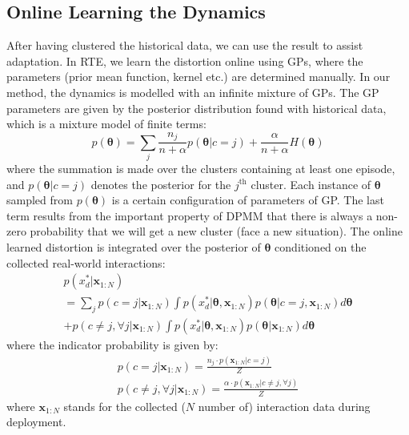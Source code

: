 \documentclass[journal]{IEEEtran}
\begin{document}
\subsection{Online Learning the Dynamics}
After having clustered the historical data, we can use the result to assist adaptation.
In RTE, we learn the distortion online using GPs, where the parameters (prior mean function, kernel etc.) are determined manually.
In our method, the dynamics is modelled with an infinite mixture of GPs. 
The GP parameters are given by the posterior distribution found with historical data, which is a mixture model of finite terms:
\begin{equation}
p(\bm{\theta}) = \sum_j \frac{n_j}{n + \alpha} p(\bm{\theta}|c=j) 
+ \frac{\alpha}{n + \alpha} H(\bm{\theta})
\label{trained_mixture_model}
\end{equation}
where the summation is made over the clusters containing at least one episode, and $p(\bm{\theta}|c=j)$ denotes the posterior for the $j^{\text{th}}$ cluster.
Each instance of $\bm{\theta}$ sampled from $p(\bm{\theta})$ is a certain configuration of parameters of GP.
The last term results from the important property of DPMM that there is always a non-zero probability that we will get a new cluster (face a new situation).
The online learned distortion is integrated over the posterior of $\bm{\theta}$ conditioned on the collected real-world interactions:
\begin{equation}
\begin{gathered}
p(x^*_d|\bm{x}_{1:N}) 
\\
= \sum_j p(c=j| \bm{x}_{1:N}) \int p(x^*_d|\bm{\theta}, \bm{x}_{1:N})p(\bm{\theta}|c=j, \bm{x}_{1:N}) d\bm{\theta} 
\\
+ p(c \neq j, \forall j|\bm{x}_{1:N}) \int p(x^*_d|\bm{\theta}, \bm{x}_{1:N}) p(\bm{\theta} | \bm{x}_{1:N}) d\bm{\theta}
\end{gathered}
\label{MGP_posterior}
\end{equation}
where the indicator probability is given by:
\begin{equation}
\begin{gathered}
p(c=j| \bm{x}_{1:N}) 
= \frac{n_j \cdot p(\bm{x}_{1:N}|c=j)
}{Z}
\\ 
p(c \neq j, \forall j| \bm{x}_{1:N})
= \frac{\alpha \cdot p(\bm{x}_{1:N}|c \neq j, \forall j)
}{Z}
\end{gathered}
\label{MGP_indicator}
\end{equation}
where $\bm{x}_{1:N}$ stands for the collected ($N$ number of) interaction data during deployment.
\end{document}
